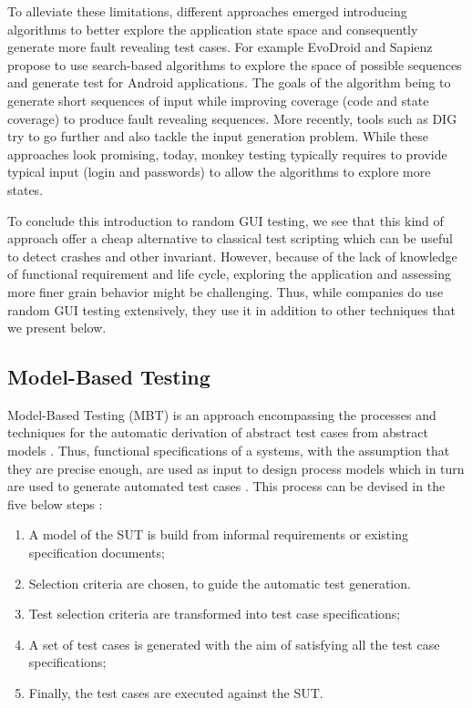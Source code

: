 To alleviate these limitations, different approaches emerged introducing algorithms to better explore the application state space and consequently generate more fault revealing test cases. For example EvoDroid \cite{Mahmood2014} and Sapienz \cite{Mao2016} propose to use search-based algorithms to explore the space of possible sequences and generate test for Android applications. The goals of the algorithm being to generate short sequences of input while improving coverage (code and state coverage) to produce fault revealing sequences. More recently, tools such as DIG \cite{Biagiola2019} try to go further and also tackle the input generation problem. While these approaches look promising, today, monkey testing typically requires to provide typical input (\eg login and passwords) to allow the algorithms to explore more states.

To conclude this introduction to random GUI testing, we see that this kind of approach offer a cheap alternative to classical test scripting which can be useful to detect crashes and other invariant. However, because of the lack of knowledge of functional requirement and life cycle, exploring the application and assessing more finer grain behavior might be challenging. Thus, while companies do use random GUI testing extensively, they use it in addition to other techniques that we present below.

\subsection{Model-Based Testing}
\label{sec:introduction-model-based-testing}

Model-Based Testing (MBT) is an approach encompassing the processes and techniques for the automatic derivation of abstract test cases from abstract models \cite{Utting2012}. Thus, functional specifications of a systems, with the assumption that they are precise enough, are used as input to design process models which in turn are used to generate automated test cases \cite{Gupta2011}. This process can be devised in the five below steps \cite{Utting2012}:

\begin{enumerate}
    \item A model of the SUT is build from informal requirements or existing specification documents;
    \item Selection criteria are chosen, to guide the automatic test generation.
    \item Test selection criteria are transformed into test case specifications;
    \item A set of test cases is generated with the aim of satisfying all the test case specifications;
    \item Finally, the test cases are executed against the SUT.
\end{enumerate}

